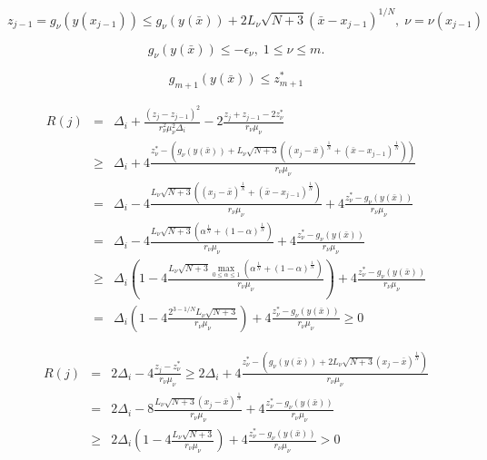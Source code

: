 \documentclass[review]{elsarticle}
\begin{document}
\[
	z_{j-1}=g_{\nu}\left( y(x_{j-1}) \right) \leq g_{\nu}\left( y(\bar x) \right) + 2L_{\nu}\sqrt{N+3}(\bar x - x_{j-1})^{1/N}, \; \nu=\nu(x_{j-1})
\]

\[
	g_{\nu}\left( y(\bar x) \right) \leq -\epsilon_{\nu}, \; 1\leq\nu\leq m.
\]

\[
	g_{m+1}\left( y(\bar x) \right) \leq z_{m+1}^*
\]

\begin{eqnarray}
	R(j) &=& \Delta_i + \frac{(z_j-z_{j-1})^2}{r_{\nu}^2\mu_{\nu}^2\Delta_i} - 2\frac{z_j+z_{j-1}-2z_{\nu}^*}{r_{\nu}\mu_{\nu}}  \nonumber \\
	&\geq& \Delta_i + 4\frac{z_{\nu}^*-\left( g_{\nu}\left( y(\bar x) \right)+L_{\nu}\sqrt{N+3}\left( (x_j-\bar x)^{\frac{1}{N}}+(\bar x - x_{j-1})^{\frac{1}{N}} \right)\right)}{r_{\nu}\mu_{\nu}} \nonumber \\
	&=& \Delta_i-4\frac{L_{\nu}\sqrt{N+3}\left( (x_j-\bar x)^{\frac{1}{N}}+(\bar x - x_{j-1})^{\frac{1}{N}} \right)}{r_{\nu}\mu_{\nu}}+4\frac{z_{\nu}^*-g_{\nu}\left( y(\bar x) \right)}{r_{\nu}\mu_{\nu}} \nonumber \\
	&=& \Delta_i-4\frac{L_{\nu}\sqrt{N+3}\left( \alpha^{\frac{1}{N}}+(1-\alpha)^{\frac{1}{N}} \right)}{r_{\nu}\mu_{\nu}}+4\frac{z_{\nu}^*-g_{\nu}\left( y(\bar x) \right)}{r_{\nu}\mu_{\nu}} \nonumber \\
	&\geq& \Delta_i\left(1-4\frac{L_{\nu}\sqrt{N+3}\max_{0\leq\alpha\leq1} {\left( \alpha^{\frac{1}{N}}+(1-\alpha)^{\frac{1}{N}} \right)}}{r_{\nu}\mu_{\nu}} \right)+4\frac{z_{\nu}^*-g_{\nu}\left( y(\bar x) \right)}{r_{\nu}\mu_{\nu}} \nonumber \\
	&=& \Delta_i\left(1-4\frac{2^{3-1/N}L_{\nu}\sqrt{N+3}}{r_{\nu}\mu_{\nu}} \right)+4\frac{z_{\nu}^*-g_{\nu}\left( y(\bar x) \right)}{r_{\nu}\mu_{\nu}} \geq 0
	\nonumber
\end{eqnarray}

\begin{eqnarray}
	R(j) &=& 2\Delta_i - 4\frac{z_j-z_{\nu}^*}{r_{\nu}\mu_{\nu}} \geq 2\Delta_i+4\frac{z_{\nu}^*-\left( g_{\nu}\left(y(\bar x)\right)+2L_{\nu}\sqrt{N+3}(x_j-\bar x)^{\frac{1}{N}} \right)}{r_{\nu}\mu_{\nu}} \nonumber \\
	&=& 2\Delta_i - 8\frac{L_{\nu}\sqrt{N+3}(x_j-\bar x)^{\frac{1}{N}}}{r_{\nu}\mu_{\nu}}+4\frac{z_{\nu}^*-g_{\nu}\left( y(\bar x) \right)}{r_{\nu}\mu_{\nu}} \nonumber \\
	&\geq& 2\Delta_i\left( 1-4\frac{L_{\nu}\sqrt{N+3}}{r_{\nu}\mu_{\nu}} \right) + 4\frac{z_{\nu}^*-g_{\nu}\left( y(\bar x) \right)}{r_{\nu}\mu_{\nu}} > 0
	\nonumber
\end{eqnarray}
\end{document}
